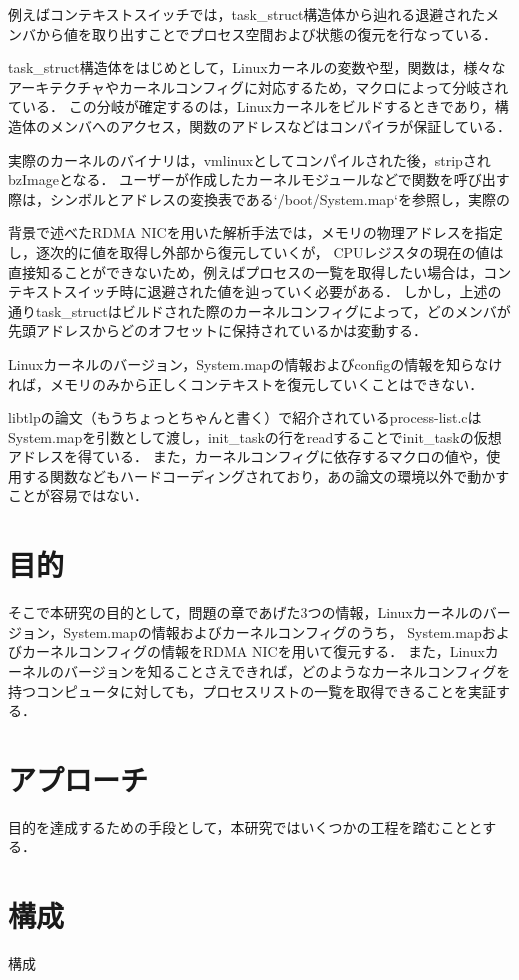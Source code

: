 例えばコンテキストスイッチでは，task_struct構造体から辿れる退避されたメンバから値を取り出すことでプロセス空間および状態の復元を行なっている．

task_struct構造体をはじめとして，Linuxカーネルの変数や型，関数は，様々なアーキテクチャやカーネルコンフィグに対応するため，マクロによって分岐されている．
この分岐が確定するのは，Linuxカーネルをビルドするときであり，構造体のメンバへのアクセス，関数のアドレスなどはコンパイラが保証している．

実際のカーネルのバイナリは，vmlinuxとしてコンパイルされた後，stripされbzImageとなる．
ユーザーが作成したカーネルモジュールなどで関数を呼び出す際は，シンボルとアドレスの変換表である`/boot/System.map`を参照し，実際の

背景で述べたRDMA NICを用いた解析手法では，メモリの物理アドレスを指定し，逐次的に値を取得し外部から復元していくが，
CPUレジスタの現在の値は直接知ることができないため，例えばプロセスの一覧を取得したい場合は，コンテキストスイッチ時に退避された値を辿っていく必要がある．
しかし，上述の通りtask_structはビルドされた際のカーネルコンフィグによって，どのメンバが先頭アドレスからどのオフセットに保持されているかは変動する．

Linuxカーネルのバージョン，System.mapの情報およびconfigの情報を知らなければ，メモリのみから正しくコンテキストを復元していくことはできない．

libtlpの論文（もうちょっとちゃんと書く）で紹介されているprocess-list.cはSystem.mapを引数として渡し，init_taskの行をreadすることでinit_taskの仮想アドレスを得ている．
また，カーネルコンフィグに依存するマクロの値や，使用する関数などもハードコーディングされており，あの論文の環境以外で動かすことが容易ではない．

\section{目的}

そこで本研究の目的として，問題の章であげた3つの情報，Linuxカーネルのバージョン，System.mapの情報およびカーネルコンフィグのうち，
System.mapおよびカーネルコンフィグの情報をRDMA NICを用いて復元する．
また，Linuxカーネルのバージョンを知ることさえできれば，どのようなカーネルコンフィグを持つコンピュータに対しても，プロセスリストの一覧を取得できることを実証する．

\section{アプローチ}

目的を達成するための手段として，本研究ではいくつかの工程を踏むこととする．

\section{構成}

構成
